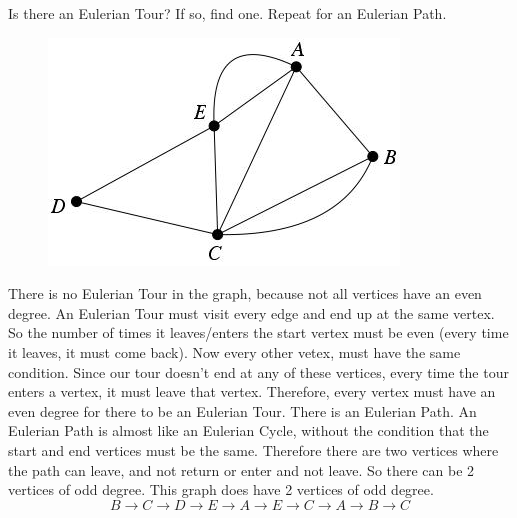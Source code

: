 \question Is there an Eulerian Tour? If so, find one. Repeat for an 
Eulerian Path. \newline

\begin{figure}[h]
\includegraphics{find_tour}
\centering
\end{figure}

\begin{solution}[0.2in] There is no Eulerian Tour in the graph, because 
not all vertices have an even degree. An Eulerian Tour must visit every 
edge and end up at the same vertex. So the number of times it leaves/enters 
the start vertex must be even (every time it leaves, it must come back). 
Now every other vetex, must have the same condition. Since our tour 
doesn't end at any of these vertices, every time the tour enters a vertex, 
it must leave that vertex. Therefore, every vertex must have an even 
degree for there to be an Eulerian Tour. \newline
There is an Eulerian Path. An Eulerian Path is almost like an Eulerian 
Cycle, without the condition that the start and end vertices must be 
the same. Therefore there are two vertices where the path can leave, 
and not return or enter and not leave. So there can be 2 vertices of 
odd degree. This graph does have 2 vertices of odd degree. 
\[B \rightarrow C \rightarrow D \rightarrow E \rightarrow A 
\rightarrow E \rightarrow C \rightarrow A \rightarrow B \rightarrow C\]
\end{solution}